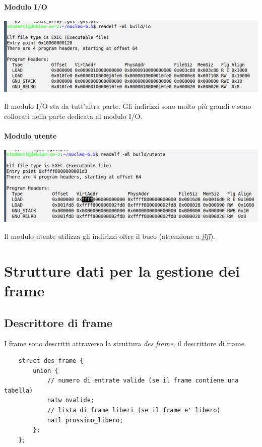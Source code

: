 \paragraph{Modulo I/O} 
\begin{center}
	\includegraphics[scale=.70]{img/251.PNG}
\end{center}
Il modulo I/O sta da tutt'altra parte. Gli indirizzi sono molto più grandi e sono collocati nella parte dedicata al modulo I/O. 

\clearpage 
\paragraph{Modulo utente} 
\begin{center}
	\includegraphics[scale=.75]{img/250.PNG}
\end{center}
Il modulo utente utilizza gli indirizzi oltre il buco (attenzione a \emph{ffff}).

\section{Strutture dati per la gestione dei frame}
\subsection{Descrittore di frame}
I frame sono descritti attraverso la struttura \emph{des$\_$frame}, il descrittore di frame.
\small 
\begin{verbatim}
	struct des_frame {
		union {
			// numero di entrate valide (se il frame contiene una tabella)
			natw nvalide;
			// lista di frame liberi (se il frame e' libero)
			natl prossimo_libero;
		};
	};
\end{verbatim}
\normalsize 
